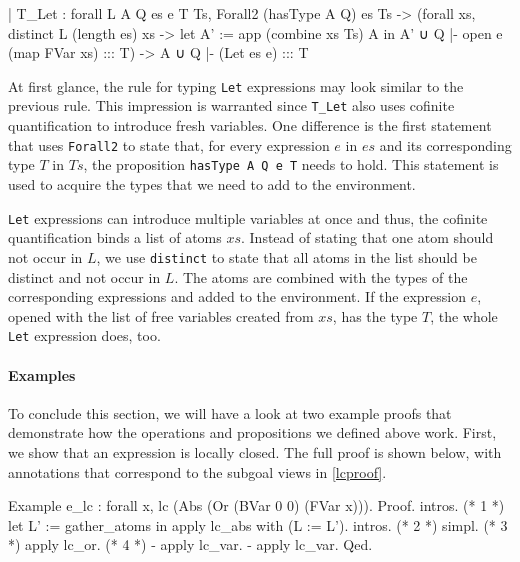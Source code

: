 \documentclass[a4paper, 11pt, fleqn]{scrreprt}
\newcommand{\coqinline}[1]{\texttt{#1}}
\begin{document}
    \begin{coqcode}
| T_Let : forall L A Q es e T Ts,
    Forall2 (hasType A Q) es Ts ->
    (forall xs,
      distinct L (length es) xs ->
      let A' := app (combine xs Ts) A in
      A' ∪ Q |- open e (map FVar xs) ::: T) ->
    A ∪ Q |- (Let es e) ::: T
    \end{coqcode}
	\noindent
	At first glance, the rule for typing \coqinline{Let} expressions may look similar to the previous rule. This impression is warranted since \coqinline{T_Let} also uses cofinite quantification to introduce fresh variables. One difference is the first statement that uses \coqinline{Forall2} to state that, for every expression $e$ in $es$ and its corresponding type $T$ in $Ts$, the proposition \coqinline{hasType A Q e T} needs to hold. This statement is used to acquire the types that we need to add to the environment.
	\par
	\coqinline{Let} expressions can introduce multiple variables at once and thus, the cofinite quantification binds a list of atoms $xs$. Instead of stating that one atom should not occur in $L$, we use \coqinline{distinct} to state that all atoms in the list should be distinct and not occur in $L$. The atoms are combined with the types of the corresponding expressions and added to the environment. If the expression $e$, opened with the list of free variables created from $xs$, has the type $T$, the whole \coqinline{Let} expression does, too.	
	
	\paragraph{Examples}
	To conclude this section, we will have a look at two example proofs that demonstrate how the operations and propositions we defined above work. First, we show that an expression is locally closed. The full proof is shown below, with annotations that correspond to the subgoal views in \autoref{lcproof}.
		\begin{coqcode}
Example e_lc : forall x, lc (Abs (Or (BVar 0 0) (FVar x))).
  Proof.
    intros. (* 1 *)
    let L' := gather_atoms in apply lc_abs with (L := L').
    intros. (* 2 *)
    simpl.  (* 3 *)
    apply lc_or. (* 4 *)
    - apply lc_var.
    - apply lc_var.
  Qed.
	\end{coqcode}
\end{document}
